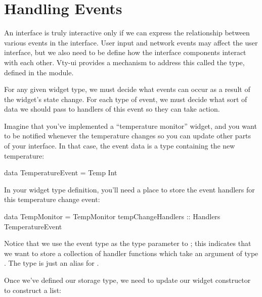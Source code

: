 \section{Handling Events}
\label{sec:event_handlers}

An interface is truly interactive only if we can express the
relationship between various events in the interface.  User input and
network events may affect the user interface, but we also need to be
define how the interface components interact with each other.  Vty-ui
provides a mechanism to address this called the  type,
defined in the  module.

For any given widget type, we must decide what events can occur as a
result of the widget's state change.  For each type of event, we must
decide what sort of data we should pass to handlers of this event so
they can take action.

Imagine that you've implemented a ``temperature monitor'' widget, and
you want to be notified whenever the temperature changes so you can
update other parts of your interface.  In that case, the event data is
a type containing the new temperature:

\begin{haskellcode}
 data TemperatureEvent = Temp Int
\end{haskellcode}

In your widget type definition, you'll need a place to store the event
handlers for this temperature change event:

\begin{haskellcode}
 data TempMonitor =
   TempMonitor { tempChangeHandlers :: Handlers TemperatureEvent
               }
\end{haskellcode}

Notice that we use the event type as the type parameter to
; this indicates that we want to store a collection of
handler functions which take an argument of type
.  The  type is just an alias for
.

Once we've defined our storage type, we need to update our widget
constructor to construct a  list:


